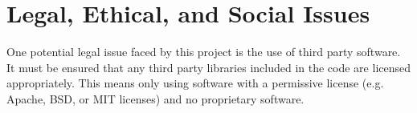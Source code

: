 \section{Legal, Ethical, and Social Issues}
\label{section:professional_issues}

One potential legal issue faced by this project is the use of third party software.
It must be ensured that any third party libraries included in the code are licensed
appropriately. This means only using software with a permissive license (e.g. Apache,
BSD, or MIT licenses) and no proprietary software.
